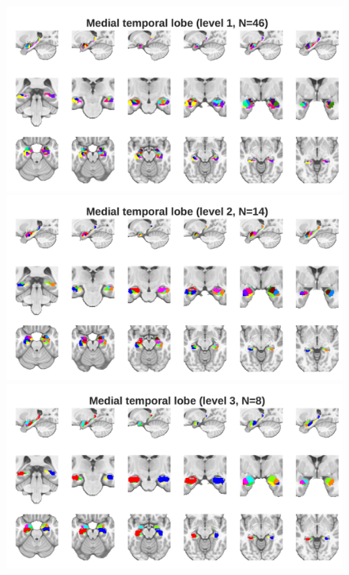 \documentclass[10pt,letterpaper]{article}
\begin{document}
\begin{figure}[t]
\centering
\begin{minipage}{\linewidth}
\includegraphics[width=\linewidth]{images/mtl_fine.png}
\end{minipage}
\begin{minipage}{\linewidth}
\includegraphics[width=\linewidth]{images/mtl_coarse.png}
\end{minipage}
\begin{minipage}{\linewidth}
\includegraphics[width=\linewidth]{images/mtl_coarser.png}

\end{minipage}
\end{figure}
\end{document}
